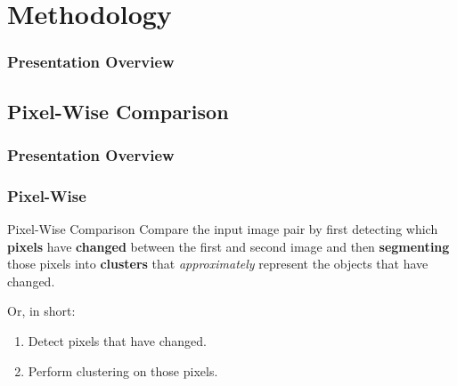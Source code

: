\documentclass[13.5pt,aspecratio=169, xcolor=dvipsnames]{beamer}
\begin{document}
    
\section{Methodology} %
\begin{frame}
	\frametitle{Presentation Overview} %
	\tableofcontents[currentsection]
\end{frame}


\subsection{Pixel-Wise Comparison}
\begin{frame}
    \frametitle{Presentation Overview}
    \tableofcontents[currentsubsection, sectionstyle=show/shaded, subsectionstyle=show/shaded]
\end{frame}

\begin{frame}
    \onehalfspacing
        \frametitle{Pixel-Wise}
        
        \begin{block}{Pixel-Wise Comparison}
            Compare the input image pair by first detecting which \textbf{pixels} have \textbf{changed} between the first and second image and then \textbf{segmenting} those pixels into \textbf{clusters} that \textit{approximately} represent the objects that have changed.

        \end{block}

        Or, in short:
        \begin{enumerate}
            \item Detect pixels that have changed.
            \item Perform clustering on those pixels.
        \end{enumerate}
      
\end{frame}
    
\end{document}
